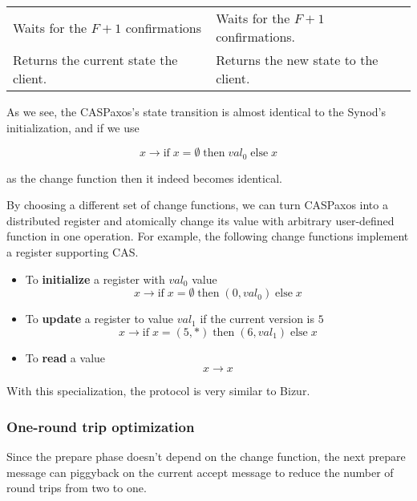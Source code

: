 \documentclass[a4paper,USenglish]{lipics-v2018}
\theoremstyle{definition}
\begin{document}
\begin{center}
\begin{longtable}{p{15em}|p{15em}}
            
            Waits for the $F+1$ confirmations
            &
            Waits for the $F+1$ confirmations. \\[6pt]
            
            
            Returns the current state the client.
            &
            Returns the new state to the client. \\[6pt]
            
            \hline
        \end{longtable}
    \end{center}

    As we see, the CASPaxos's state transition is almost identical to the Synod's initialization, and if we use

        $$x \to \mbox{if}\; x = \emptyset \;\mbox{then}\; val_0\; \mbox{else}\; x$$
    
    as the change function then it indeed becomes identical.

    By choosing a different set of change functions, we can turn CASPaxos into a distributed register and atomically change its value with arbitrary user-defined function in one operation. For example, the following change functions implement a register supporting CAS.

    \begin{itemize}
        \item To {\bf initialize} a register with $val_0$ value
        $$x \to \mbox{if}\; x = \emptyset \;\mbox{then}\; (0, val_0)\; \mbox{else}\; x$$
        
        \item To {\bf update} a register to value $val_1$ if the current version is $5$
        $$x \to \mbox{if}\; x = (5, \ast) \;\mbox{then}\; (6, val_1)\; \mbox{else}\; x$$
        
        \item To {\bf read} a value
        $$x \to x$$
    \end{itemize}

    With this specialization, the protocol is very similar to Bizur\cite{bizur}.

\subsubsection{One-round trip optimization}\label{1rtt}

    Since the prepare phase doesn't depend on the change function, the next prepare message can piggyback on the current accept message to reduce the number of round trips from two to one.
\end{document}
